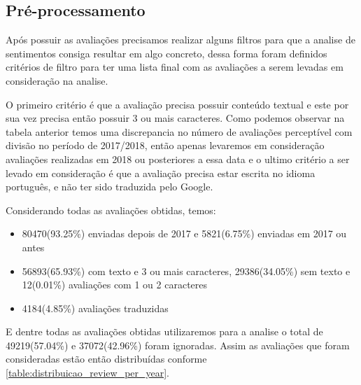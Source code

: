 \subsection{Pré-processamento}
\label{subsec:pre_processamento}

Após possuir as avaliações precisamos realizar alguns filtros para que a analise de sentimentos consiga resultar em algo concreto, dessa forma foram definidos critérios de filtro para ter uma lista final com as avaliações a serem levadas em consideração na analise.

O primeiro critério é que a avaliação precisa possuir conteúdo textual e este por sua vez precisa então possuir 3 ou mais caracteres. Como podemos observar na tabela anterior temos uma discrepancia no número de avaliações perceptível com divisão no período de 2017/2018, então apenas levaremos em consideração avaliações realizadas em 2018 ou posteriores a essa data e o ultimo critério a ser levado em consideração é que a avaliação precisa estar escrita no idioma português, e não ter sido traduzida pelo Google.




Considerando todas as avaliações obtidas, temos:

\begin{itemize}
	\item 80470(93.25\%) enviadas depois de 2017 e 5821(6.75\%) enviadas em 2017 ou antes
	\item 56893(65.93\%) com texto e 3 ou mais caracteres, 29386(34.05\%) sem texto e 12(0.01\%) avaliações com 1 ou 2 caracteres
	\item 4184(4.85\%) avaliações traduzidas
\end{itemize}

E dentre todas as avaliações obtidas utilizaremos para a analise o total de 49219(57.04\%) e 37072(42.96\%) foram ignoradas. Assim as avaliações que foram consideradas estão então distribuídas conforme \ref{table:distribuicao_review_per_year}.


